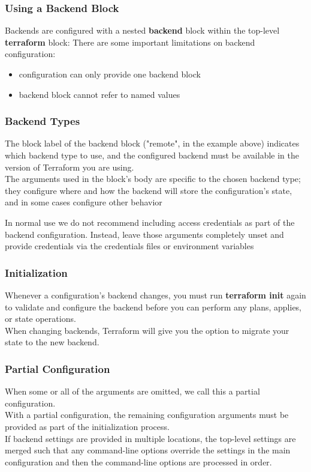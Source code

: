 \documentclass[12pt, letterpaper, twoside]{article}
\begin{document}
\subsubsection{Using a Backend Block}
Backends are configured with a nested \textbf{backend} block within the top-level \textbf{terraform} block:
There are some important limitations on backend configuration:
\begin{itemize}
	\item configuration can only provide one backend block
	\item backend block cannot refer to named values 
\end{itemize}

\subsubsection{Backend Types}
The block label of the backend block ("remote", in the example above) indicates which backend type to use,
and the configured backend must be available in the version of Terraform you are using.\\

The arguments used in the block's body are specific to the chosen backend type; they configure where and 
how the backend will store the configuration's state, and in some cases configure other behavior

In normal use we do not recommend including access credentials as part of the backend configuration. 
Instead, leave those arguments completely unset and provide credentials via the credentials files or 
environment variables 

\subsubsection{Initialization}
Whenever a configuration's backend changes, you must run \textbf{terraform init} again to validate and 
configure the backend before you can perform any plans, applies, or state operations.\\
When changing backends, Terraform will give you the option to migrate your state to the new backend.

\subsubsection{Partial Configuration}
When some or all of the arguments are omitted, we call this a partial configuration.\\
With a partial configuration, the remaining configuration arguments must be provided as part of 
the initialization process.\\
If backend settings are provided in multiple locations, the top-level settings are merged such that 
any command-line options override the settings in the main configuration and then the command-line 
options are processed in order.
\end{document}
